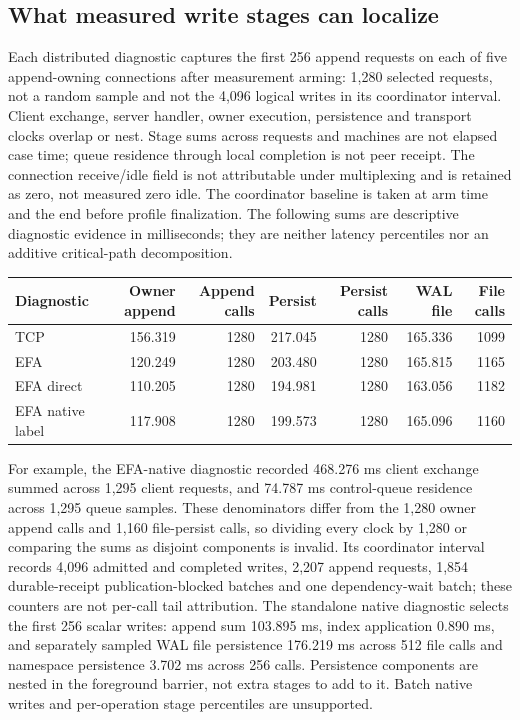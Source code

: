 \subsection{What measured write stages can localize}\label{obs-stages}
Each distributed diagnostic captures the first 256 append requests on each of five append-owning connections after measurement arming: 1,280 selected requests, not a random sample and not the 4,096 logical writes in its coordinator interval. Client exchange, server handler, owner execution, persistence and transport clocks overlap or nest. Stage sums across requests and machines are not elapsed case time; queue residence through local completion is not peer receipt. The connection receive/idle field is not attributable under multiplexing and is retained as zero, not measured zero idle. The coordinator baseline is taken at arm time and the end before profile finalization. The following sums are descriptive diagnostic evidence in milliseconds; they are neither latency percentiles nor an additive critical-path decomposition.

\begin{center}\small
\begin{tabular}{lrrrrrr}
\hline
Diagnostic & Owner append & Append calls & Persist & Persist calls & WAL file & File calls\\
\hline
TCP & 156.319 & 1280 & 217.045 & 1280 & 165.336 & 1099\\
EFA & 120.249 & 1280 & 203.480 & 1280 & 165.815 & 1165\\
EFA direct & 110.205 & 1280 & 194.981 & 1280 & 163.056 & 1182\\
EFA native label & 117.908 & 1280 & 199.573 & 1280 & 165.096 & 1160\\
\hline
\end{tabular}
\end{center}
For example, the EFA-native diagnostic recorded 468.276 ms client exchange summed across 1,295 client requests, and 74.787 ms control-queue residence across 1,295 queue samples. These denominators differ from the 1,280 owner append calls and 1,160 file-persist calls, so dividing every clock by 1,280 or comparing the sums as disjoint components is invalid. Its coordinator interval records 4,096 admitted and completed writes, 2,207 append requests, 1,854 durable-receipt publication-blocked batches and one dependency-wait batch; these counters are not per-call tail attribution. The standalone native diagnostic selects the first 256 scalar writes: append sum 103.895 ms, index application 0.890 ms, and separately sampled WAL file persistence 176.219 ms across 512 file calls and namespace persistence 3.702 ms across 256 calls. Persistence components are nested in the foreground barrier, not extra stages to add to it. Batch native writes and per-operation stage percentiles are unsupported.

